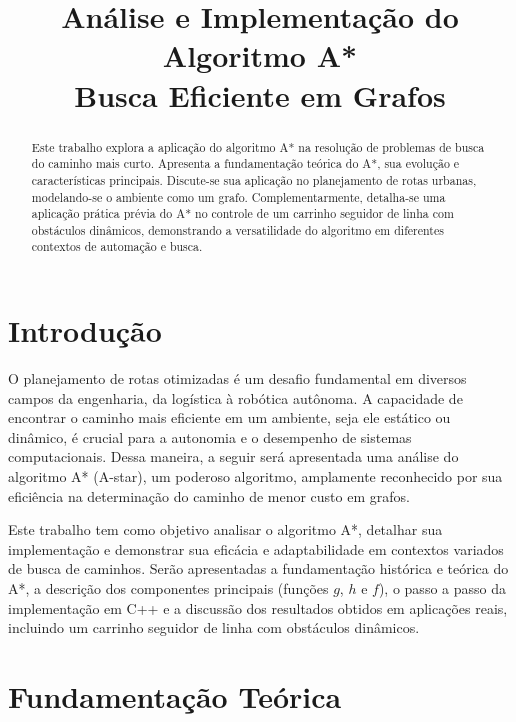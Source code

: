 \documentclass[conference]{IEEEtran}
\begin{document}
\title{Análise e Implementação do Algoritmo A*\\Busca Eficiente em Grafos}

\author{
}

\maketitle

\begin{abstract}
Este trabalho explora a aplicação do algoritmo A* na resolução de problemas de busca do caminho mais curto. Apresenta a fundamentação teórica do A*, sua evolução e características principais. Discute-se sua aplicação no planejamento de rotas urbanas, modelando-se o ambiente como um grafo. Complementarmente, detalha-se uma aplicação prática prévia do A* no controle de um carrinho seguidor de linha com obstáculos dinâmicos, demonstrando a versatilidade do algoritmo em diferentes contextos de automação e busca.
\end{abstract}

\IEEEpeerreviewmaketitle

\section{Introdução}
O planejamento de rotas otimizadas é um desafio fundamental em diversos campos da engenharia, da logística à robótica autônoma. A capacidade de encontrar o caminho mais eficiente em um ambiente, seja ele estático ou dinâmico, é crucial para a autonomia e o desempenho de sistemas computacionais. Dessa maneira, a seguir será apresentada uma análise do algoritmo A* (A-star), um poderoso algoritmo, amplamente reconhecido por sua eficiência na determinação do caminho de menor custo em grafos.

Este trabalho tem como objetivo analisar o algoritmo A*, detalhar sua implementação e demonstrar sua eficácia e adaptabilidade em contextos variados de busca de caminhos. Serão apresentadas a fundamentação histórica e teórica do A*, a descrição dos componentes principais (funções \(g\), \(h\) e \(f\)), o passo a passo da implementação em C++ e a discussão dos resultados obtidos em aplicações reais, incluindo um carrinho seguidor de linha com obstáculos dinâmicos.

\section{Fundamentação Teórica}
\end{document}
